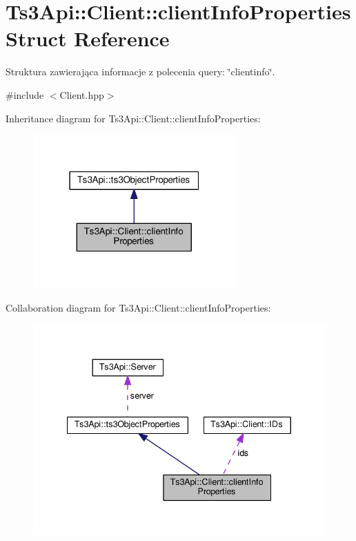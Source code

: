 \hypertarget{struct_ts3_api_1_1_client_1_1client_info_properties}{}\section{Ts3\+Api\+:\+:Client\+:\+:client\+Info\+Properties Struct Reference}
\label{struct_ts3_api_1_1_client_1_1client_info_properties}


Struktura zawierająca informacje z polecenia query\+: \char`\"{}clientinfo\char`\"{}.  




{\ttfamily \#include $<$Client.\+hpp$>$}



Inheritance diagram for Ts3\+Api\+:\+:Client\+:\+:client\+Info\+Properties\+:\nopagebreak
\begin{figure}[H]
\begin{center}
\leavevmode
\includegraphics[width=220pt]{struct_ts3_api_1_1_client_1_1client_info_properties__inherit__graph}
\end{center}
\end{figure}


Collaboration diagram for Ts3\+Api\+:\+:Client\+:\+:client\+Info\+Properties\+:\nopagebreak
\begin{figure}[H]
\begin{center}
\leavevmode
\includegraphics[width=340pt]{struct_ts3_api_1_1_client_1_1client_info_properties__coll__graph}
\end{center}
\end{figure}
